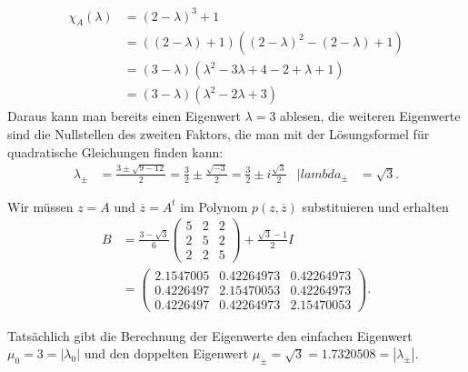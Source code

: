 \begin{loesung}
\begin{teilaufgaben}
\begin{align*}
\chi_A(\lambda)
&=
(2-\lambda)^3+1
\\
&=
((2-\lambda)+1)
((2-\lambda)^2 -(2-\lambda)+1)
\\
&=
(3-\lambda)
(\lambda^2-3\lambda +4-2+\lambda +1)
\\
&=
(3-\lambda)
(\lambda^2-2\lambda +3)
\end{align*}
Daraus kann man bereits einen Eigenwert $\lambda=3$ ablesen,
die weiteren Eigenwerte sind die Nullstellen des zweiten Faktors, die
man mit der Lösungsformel für quadratische Gleichungen finden kann:
\begin{align*}
\lambda_{\pm}
&=
\frac{3\pm\sqrt{9-12}}{2}
=
\frac{3}{2} \pm\frac{\sqrt{-3}}{2}
=
\frac{3}{2} \pm i\frac{\sqrt{3}}{2}
&|lambda_{\pm}&=\sqrt{3}.
\end{align*}
\item
Wir müssen $z=A$ und $\overline{z}=A^t$ im Polynom $p(z,\overline{z})$
substituieren und erhalten
\begin{align*}
B
&=
\frac{3-\sqrt{3}}6 \begin{pmatrix}5&2&2\\2&5&2\\2&2&5\end{pmatrix}
+\frac{\sqrt{3}-1}{2}I
\\
&=
\begin{pmatrix}
   2.1547005&  0.42264973&  0.42264973 \\
   0.4226497&  2.15470053&  0.42264973 \\
   0.4226497&  0.42264973&  2.15470053
\end{pmatrix}.
\end{align*}
\item
Tatsächlich gibt die Berechnung der Eigenwerte
den einfachen Eigenwert $\mu_0=3=|\lambda_0|$
und
den doppelten Eigenwert $\mu_{\pm} = \sqrt{3}=1.7320508=|\lambda_{\pm}|$.
\qedhere
\end{teilaufgaben}
\end{loesung}
